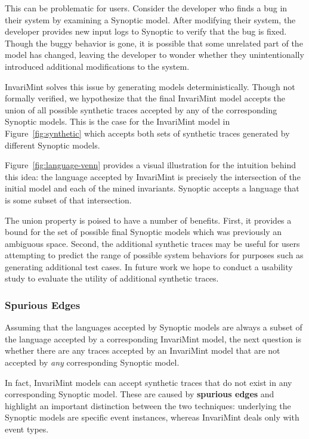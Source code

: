 This can be problematic for users. Consider the developer who finds a bug in
their system by examining a Synoptic model. After modifying their system, the
developer provides new input logs to Synoptic to verify that the bug is fixed.
Though the buggy behavior is gone, it is possible that some unrelated part of
the model has changed, leaving the developer to wonder whether they
unintentionally introduced additional modifications to the system.

InvariMint solves this issue by generating models deterministically.
Though not formally verified, we hypothesize that the final InvariMint model 
accepts the union of all possible synthetic traces accepted by any of
the corresponding Synoptic models. This is the case for the InvariMint
model in 
Figure~\ref{fig:synthetic} which accepts both sets of synthetic traces generated by different
Synoptic models.


Figure~\ref{fig:language-venn}
provides a visual illustration for the intuition behind this idea: the language accepted by InvariMint
is precisely the intersection of the initial model and each of the mined
invariants. Synoptic accepts a language that is some subset of that
intersection.

The union property is poised to have a number of benefits. First, it provides a bound for the set of
possible final Synoptic models which was previously an ambiguous space. Second,
the additional synthetic traces may be useful for users attempting
to predict the range of possible system behaviors for purposes such as generating
additional test cases. In future work we hope to conduct a
usability study to evaluate the utility of additional
synthetic traces. 

\subsubsection{Spurious Edges}
Assuming that the languages accepted by Synoptic models are always a subset of
the language accepted by a corresponding InvariMint model, the next question
is whether 
there are any traces accepted by an InvariMint model that are not
accepted by \emph{any} corresponding Synoptic model.

In fact, InvariMint models can accept synthetic traces that do not exist in any
corresponding Synoptic model. These are caused by \textbf{spurious edges} and
highlight an important distinction between the two techniques: underlying the Synoptic models
are specific event instances, whereas
InvariMint deals only with event types.

